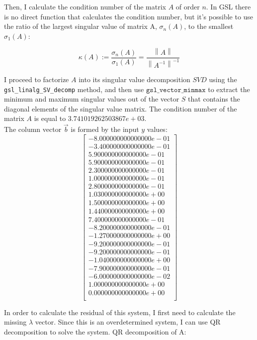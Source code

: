 \documentclass{article}
\newcommand{\code}{\texttt}
\newcommand{\norm}[1]{\left\lVert#1\right\rVert}
\begin{document}
Then, I calculate the condition number of the matrix $A$ of order $n$. In GSL there is no direct function that calculates the condition number, but it's possible to use the ratio of the largest singular value of matrix A, $\sigma_n (A)$, to the smallest $\sigma_1 (A)$:

$$\kappa(A) := \frac{\sigma_n (A)}{\sigma_1 (A)}= \frac{\norm{A}}{\norm{A^{-1}}^{-1}}$$

I proceed to factorize $A$ into its singular value decomposition $SVD$ using the \code{gsl\_linalg\_SV\_decomp} method, and then use $\code{gsl\_vector\_minmax}$ to extract the minimum and maximum singular values out of the vector $S$ that contains the diagonal elements of the singular value matrix. The condition number of the matrix $A$ is equal to $3.741019262503867e+03$.\\



The column vector $\vec{b}$ is formed by the input $y$ values:
$$
\begin{bmatrix} 
-8.000000000000000e-01\\
-3.400000000000000e-01\\
5.900000000000000e-01\\
5.900000000000000e-01\\
2.300000000000000e-01\\
1.000000000000000e-01\\
2.800000000000000e-01\\
1.030000000000000e+00\\
1.500000000000000e+00\\
1.440000000000000e+00\\
7.400000000000000e-01\\
-8.200000000000000e-01\\
-1.270000000000000e+00\\
-9.200000000000000e-01\\
-9.200000000000000e-01\\
-1.040000000000000e+00\\
-7.900000000000000e-01\\
-6.000000000000000e-02\\
1.000000000000000e+00\\
0.000000000000000e+00\\
\end{bmatrix}
$$

In order to calculate the residual of this system, I first need to calculate the missing $\lambda$ vector. Since this is an overdetermined system, I can use QR decomposition to solve the system. QR decomposition of A:
\end{document}
